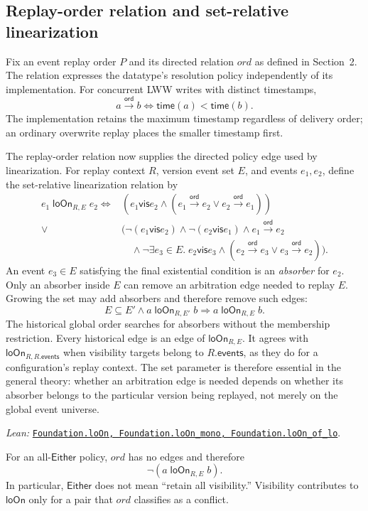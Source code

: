 \documentclass[11pt]{article}
\theoremstyle{definition}
\newcommand{\vis}{\mathrel{\mathsf{vis}}}
\newcommand{\ord}{\mathrel{\xrightarrow{\mathsf{ord}}}}
\newcommand{\loOn}{\mathsf{loOn}}
\newcommand{\src}[2]{\href{../../#1}{\texttt{#2}}}
\newcommand{\anchor}[2]{\par\smallskip\noindent\emph{Lean: }\src{#1}{#2}.}
\begin{document}
\subsection{Replay-order relation and set-relative linearization}

Fix an event replay order $P$ and its directed relation $ord$ as defined in Section~2.
The relation expresses the datatype's resolution policy independently
of its implementation. For concurrent LWW writes with distinct timestamps,
\[
 a\ord b\Longleftrightarrow \mathsf{time}(a)<\mathsf{time}(b).
\]
The implementation retains the maximum timestamp regardless of delivery
order; an ordinary overwrite replay places the smaller timestamp first.

\label{sec:ord-order}

The replay-order relation now supplies the directed policy edge used by
linearization. For replay context $R$, version event set $E$, and events
$e_1,e_2$, define the set-relative linearization relation by
\[
\begin{aligned}
 e_1\;\loOn_{R,E}\;e_2\Longleftrightarrow
 &(e_1\vis e_2\land(e_1\ord e_2\lor e_2\ord e_1))\\
 {}\lor{}&(\neg(e_1\vis e_2)\land\neg(e_2\vis e_1)
 \land e_1\ord e_2\\
 &\quad\land\neg\exists e_3\in E.\;
 e_2\vis e_3\land(e_2\ord e_3\lor e_3\ord e_2)).
\end{aligned}
\]
An event $e_3\in E$ satisfying the final existential condition is an
\emph{absorber} for $e_2$. Only an absorber inside $E$ can remove an
arbitration edge needed to replay $E$. Growing the set may add absorbers and
therefore remove such edges:
\[
 E\subseteq E'\land a\;\loOn_{R,E'}\;b\Longrightarrow a\;\loOn_{R,E}\;b.
\]
The historical global order searches for absorbers without the membership
restriction. Every historical edge is an edge of $\loOn_{R,E}$. It agrees
with $\loOn_{R,R.\mathsf{events}}$ when visibility targets belong to
$R.\mathsf{events}$, as they do for a configuration's replay context.
The set parameter is therefore essential in the general theory: whether an
arbitration edge is needed depends on whether its absorber belongs to the
particular version being replayed, not merely on the global event universe.
\anchor{Sal/MRDTs/Metatheory/Join/SetRelativeReplay.lean}
  {Foundation.loOn, Foundation.loOn\_mono, Foundation.loOn\_of\_lo}

For an all-$\mathsf{Either}$ policy, $ord$ has no edges and therefore
\[
 \neg(a\;\loOn_{R,E}\;b).
\]
In particular, $\mathsf{Either}$ does not mean ``retain all visibility.''
Visibility contributes to $\loOn$ only for a pair that $ord$ classifies as a
conflict.
\end{document}
